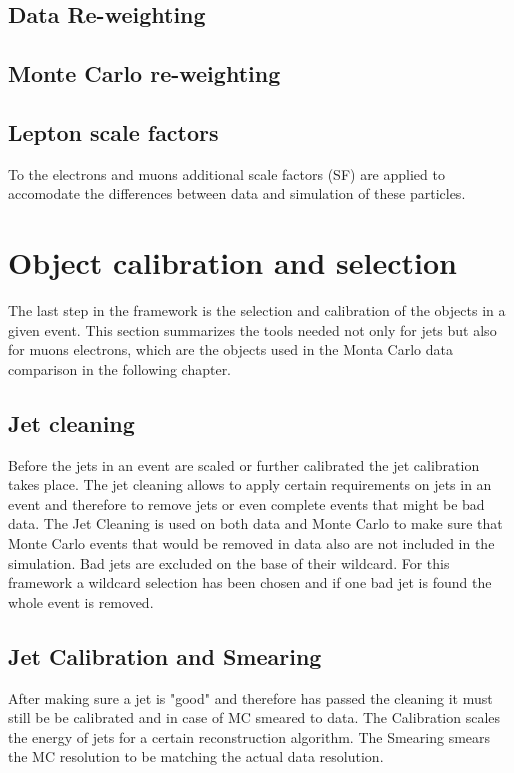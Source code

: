 \subsection{Data Re-weighting}

\subsection{Monte Carlo re-weighting}

\subsection{Lepton scale factors}

To the electrons and muons additional scale factors (SF) are applied to accomodate the differences between data and simulation of these particles.

\section{Object calibration and selection}

The last step in the framework is the selection and calibration of the objects in a given event. This section summarizes the tools needed not only for jets but also for muons electrons, which are the objects used in the Monta Carlo data comparison in the following chapter.

\subsection{Jet cleaning}

Before the jets in an event are scaled or further calibrated the jet calibration takes place. The jet cleaning allows to apply certain requirements on jets in an event and therefore to remove jets or even complete events that might be bad data. The Jet Cleaning is used on both data and Monte Carlo to make sure that Monte Carlo events that would be removed in data also are not included in the simulation.
Bad jets are excluded on the base of their wildcard.
For this framework a wildcard selection has been chosen and if one bad jet is found the whole event is removed.

\subsection{Jet Calibration and Smearing}

After making sure a jet is "good" and therefore has passed the cleaning it must still be be calibrated and in case of MC smeared to data. The Calibration scales the energy of jets for a certain reconstruction algorithm. The Smearing smears the MC resolution to be matching the actual data resolution.


